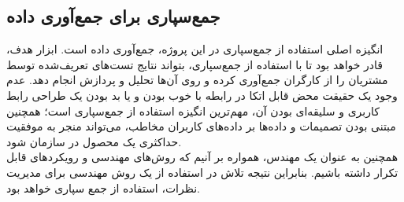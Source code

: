 \subsection{جمع‌سپاری برای جمع‌آوری داده}
انگیزه اصلی استفاده از جمع‌سپاری در این پروژه، جمع‌آوری داده است. ابزار هدف، قادر خواهد بود تا با استفاده از جمع‌سپاری، بتواند نتایج تست‌های تعریف‌شده توسط مشتریان را از کارگران جمع‌آوری کرده و روی آن‌ها تحلیل و پردازش انجام دهد. عدم وجود یک حقیقت محض قابل اتکا
در رابطه با خوب بودن و یا بد بودن یک طراحی رابط کاربری و سلیقه‌ای بودن آن، مهم‌ترین انگیزه استفاده از جمع‌سپاری است؛ همچنین مبتنی بودن تصمیمات و داده‌ها بر داده‌های کاربران مخاطب، می‌تواند منجر به موفقیت حداکثری یک محصول در سازمان شود.\\
همچنین به عنوان یک مهندس، همواره بر آنیم که روش‌های مهندسی و رویکردهای قابل تکرار داشته باشیم. بنابراین نتیجه تلاش در استفاده از یک روش مهندسی برای مدیریت نظرات، استفاده از جمع سپاری خواهد بود.
